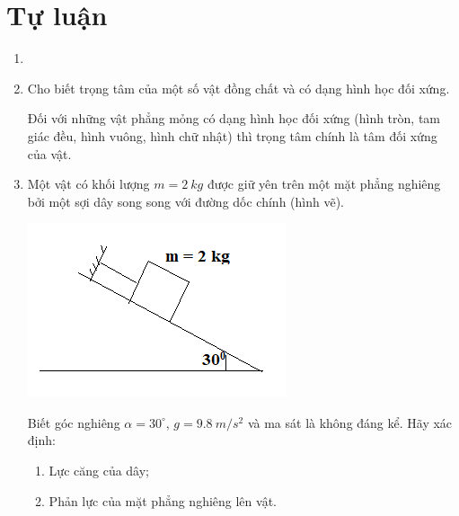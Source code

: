 \section{Tự luận}
\begin{enumerate}[label=\bfseries Câu \arabic*:]
	\item {}
	
	
	
	\item {}
	
	\cauhoi
	{Cho biết trọng tâm của một số vật đồng chất và có dạng hình học đối xứng.
	}
	
	\loigiai
	{
	Đối với những vật phẳng mỏng có dạng hình học đối xứng (hình tròn, tam giác đều, hình vuông, hình chữ nhật) thì trọng tâm chính là tâm đối xứng của vật.
	}
	\item {}
	
	\cauhoi
	{Một vật có khối lượng $m=\SI{2}{kg}$ được giữ yên trên một mặt phẳng nghiêng bởi một sợi dây song song với đường dốc chính (hình vẽ).
		\begin{center}
			\includegraphics[scale=0.8]{../figs/VN10-2021-PH-TP020-1.png}
		\end{center}
		 Biết góc nghiêng $\alpha=30^\circ$, $g=\SI{9.8}{m/s^2}$ và ma sát là không đáng kể. Hãy xác định:
		\begin{enumerate}
			\item Lực căng của dây;
			\item Phản lực của mặt phẳng nghiêng lên vật.
		\end{enumerate}
	}
	

\end{enumerate}
